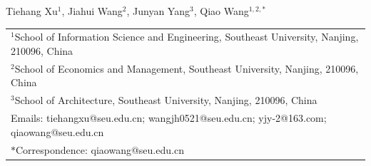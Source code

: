 Tiehang Xu$^{1}$, Jiahui Wang$^{2}$, Junyan Yang$^{3}$, Qiao Wang$^{1,2,\ast}$\\[0.5em]
\small
\begin{tabular}{@{}l@{}}
$^{1}$School of Information Science and Engineering, Southeast University, Nanjing, 210096, China\\
$^{2}$School of Economics and Management, Southeast University, Nanjing, 210096, China\\
$^{3}$School of Architecture, Southeast University, Nanjing, 210096, China\\
Emails: tiehangxu@seu.edu.cn; wangjh0521@seu.edu.cn; yjy-2@163.com; qiaowang@seu.edu.cn\\
$\ast$Correspondence: qiaowang@seu.edu.cn
\end{tabular}
